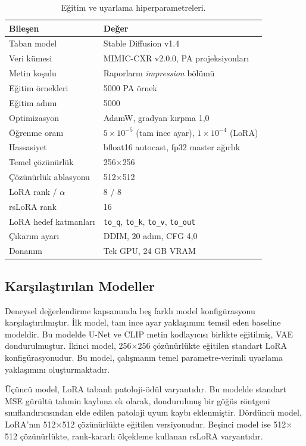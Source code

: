\documentclass[11pt]{article}
\begin{document}
\begin{table}[htbp]
\centering
\caption{Eğitim ve uyarlama hiperparametreleri.}
\label{tab:hp}
\small
\begin{tabular}{@{}ll@{}}
\toprule
\textbf{Bileşen} & \textbf{Değer} \\
\midrule
Taban model & Stable Diffusion v1.4 \\
Veri kümesi & MIMIC-CXR v2.0.0, PA projeksiyonları \\
Metin koşulu & Raporların \emph{impression} bölümü \\
Eğitim örnekleri & 5000 PA örnek \\
Eğitim adımı & 5000 \\
Optimizasyon & AdamW, gradyan kırpma 1,0 \\
Öğrenme oranı & $5\times10^{-5}$ (tam ince ayar), $1\times10^{-4}$ (LoRA) \\
Hassasiyet & bfloat16 autocast, fp32 master ağırlık \\
Temel çözünürlük & 256$\times$256 \\
Çözünürlük ablasyonu & 512$\times$512 \\
LoRA rank / $\alpha$ & 8 / 8 \\
rsLoRA rank & 16 \\
LoRA hedef katmanları & \texttt{to\_q}, \texttt{to\_k}, \texttt{to\_v}, \texttt{to\_out} \\
Çıkarım ayarı & DDIM, 20 adım, CFG 4,0 \\
Donanım & Tek GPU, 24 GB VRAM \\
\bottomrule
\end{tabular}
\end{table}

\subsection{Karşılaştırılan Modeller}

Deneysel değerlendirme kapsamında beş farklı model konfigürasyonu
karşılaştırılmıştır. İlk model, tam ince ayar yaklaşımını temsil eden baseline
modeldir. Bu modelde U-Net ve CLIP metin kodlayıcısı birlikte eğitilmiş, VAE
dondurulmuştur. İkinci model, 256$\times$256 çözünürlükte eğitilen standart
LoRA konfigürasyonudur. Bu model, çalışmanın temel parametre-verimli uyarlama
yaklaşımını oluşturmaktadır.

Üçüncü model, LoRA tabanlı patoloji-ödül varyantıdır. Bu modelde standart MSE
gürültü tahmin kaybına ek olarak, dondurulmuş bir göğüs röntgeni
sınıflandırıcısından elde edilen patoloji uyum kaybı eklenmiştir. Dördüncü
model, LoRA'nın 512$\times$512 çözünürlükte eğitilen versiyonudur. Beşinci
model ise 512$\times$512 çözünürlükte, rank-kararlı ölçekleme kullanan
rsLoRA varyantıdır.
\end{document}
